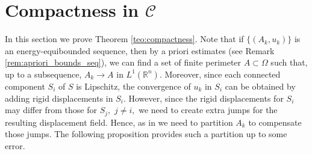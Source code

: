 \documentclass[reqno]{amsart}
\numberwithin{equation}{section}
\theoremstyle{plain}
\theoremstyle{definition}
\newcommand{\R}{\mathbb{R}}
\newcommand{\admissible}{\mathcal{C}}
\begin{document}
\section{Compactness in $\admissible$}\label{sec:compactoser}

 In this section we prove Theorem \ref{teo:compactness}. Note that if $\{(A_k,u_k)\}$ is an energy-equibounded sequence, then by a priori estimates (see Remark \ref{rem:apriori_bounds_seq}), we can find a set of finite perimeter $A\subset\Omega$ such that, up to a subsequence,  $A_k\to A$ in $L^1(\R^n).$ Moreover, since each connected component $S_i$ of $S$ is Lipschitz, the convergence of $u_k$ in $S_i$ can be obtained  by adding rigid displacements in $S_i.$ However, since the rigid displacements for $S_i$ may differ from those for $S_j,$ $j\ne i,$ we need to create extra jumps for the  resulting displacement field. Hence, as in \cite{HP:2020_arma} we need to partition $A_k$ to compensate those jumps. The following proposition provides such a partition up to some error.
\end{document}
